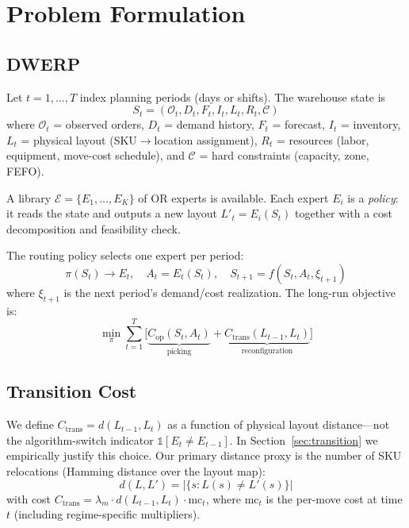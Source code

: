 \documentclass[11pt,a4paper]{article}
\begin{document}
\section{Problem Formulation}\label{sec:formulation}

\subsection{DWERP}

Let $t = 1, \ldots, T$ index planning periods (days or shifts). The
warehouse state is
\begin{equation}
S_t = (\mathcal{O}_t, D_t, F_t, I_t, L_t, R_t, \mathcal{C})
\end{equation}
where $\mathcal{O}_t$ = observed orders, $D_t$ = demand history, $F_t$ =
forecast, $I_t$ = inventory, $L_t$ = physical layout (SKU$\to$location
assignment), $R_t$ = resources (labor, equipment, move-cost schedule), and
$\mathcal{C}$ = hard constraints (capacity, zone, FEFO).

A library $\mathcal{E} = \{E_1, \ldots, E_K\}$ of OR experts is available.
Each expert $E_i$ is a \emph{policy}: it reads the state and outputs a new
layout $L'_t = E_i(S_t)$ together with a cost decomposition and feasibility
check.

The routing policy selects one expert per period:
\begin{equation}
\pi(S_t) \to E_t, \quad A_t = E_t(S_t), \quad S_{t+1} = f(S_t, A_t, \xi_{t+1})
\end{equation}
where $\xi_{t+1}$ is the next period's demand/cost realization. The
long-run objective is:
\begin{equation}\label{eq:objective}
\min_{\pi} \sum_{t=1}^{T} \Big[
\underbrace{C_{\text{op}}(S_t, A_t)}_{\text{picking}} +
\underbrace{C_{\text{trans}}(L_{t-1}, L_t)}_{\text{reconfiguration}}
\Big]
\end{equation}

\subsection{Transition Cost}

We define $C_{\text{trans}} = d(L_{t-1}, L_t)$ as a function of physical
layout distance---not the algorithm-switch indicator
$\mathbb{1}[E_t \neq E_{t-1}]$. In Section~\ref{sec:transition} we
empirically justify this choice. Our primary distance proxy is the number
of SKU relocations (Hamming distance over the layout map):
\begin{equation}
d(L, L') = |\{s : L(s) \neq L'(s)\}|
\end{equation}
with cost $C_{\text{trans}} = \lambda_m \cdot d(L_{t-1}, L_t) \cdot
\text{mc}_t$, where $\text{mc}_t$ is the per-move cost at time $t$
(including regime-specific multipliers).
\end{document}
